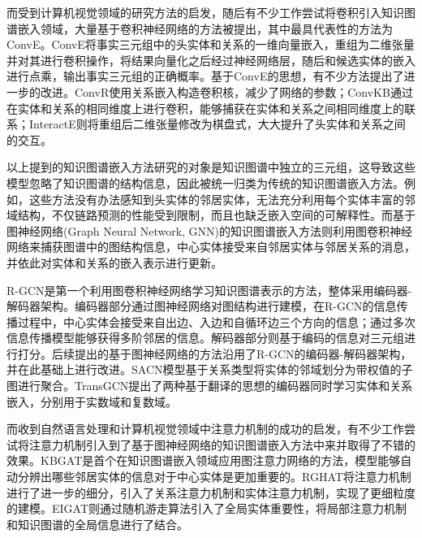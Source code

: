 而受到计算机视觉领域的研究方法的启发，随后有不少工作尝试将卷积引入知识图谱嵌入领域，大量基于卷积神经网络的方法被提出，其中最具代表性的方法为ConvE。ConvE将事实三元组中的头实体和关系的一维向量嵌入，重组为二维张量并对其进行卷积操作，将结果向量化之后经过神经网络层，随后和候选实体的嵌入进行点乘，输出事实三元组的正确概率。基于ConvE的思想，有不少方法提出了进一步的改进。ConvR使用关系嵌入构造卷积核，减少了网络的参数；ConvKB通过在实体和关系的相同维度上进行卷积，能够捕获在实体和关系之间相同维度上的联系；InteractE则将重组后二维张量修改为棋盘式，大大提升了头实体和关系之间的交互。

以上提到的知识图谱嵌入方法研究的对象是知识图谱中独立的三元组，这导致这些模型忽略了知识图谱的结构信息，因此被统一归类为传统的知识图谱嵌入方法。例如，这些方法没有办法感知到头实体的邻居实体，无法充分利用每个实体丰富的邻域结构，不仅链路预测的性能受到限制，而且也缺乏嵌入空间的可解释性。而基于图神经网络(Graph Neural Network, GNN)的知识图谱嵌入方法则利用图卷积神经网络来捕获图谱中的图结构信息，中心实体接受来自邻居实体与邻居关系的消息，并依此对实体和关系的嵌入表示进行更新。

R-GCN是第一个利用图卷积神经网络学习知识图谱表示的方法，整体采用编码器-解码器架构。编码器部分通过图神经网络对图结构进行建模，在R-GCN的信息传播过程中，中心实体会接受来自出边、入边和自循环边三个方向的信息；通过多次信息传播模型能够获得多阶邻居的信息。解码器部分则基于编码的信息对三元组进行打分。后续提出的基于图神经网络的方法沿用了R-GCN的编码器-解码器架构，并在此基础上进行改进。SACN模型基于关系类型将实体的邻域划分为带权值的子图进行聚合。TransGCN提出了两种基于翻译的思想的编码器同时学习实体和关系嵌入，分别用于实数域和复数域。

而收到自然语言处理和计算机视觉领域中注意力机制的成功的启发，有不少工作尝试将注意力机制引入到了基于图神经网络的知识图谱嵌入方法中来并取得了不错的效果。KBGAT是首个在知识图谱嵌入领域应用图注意力网络的方法，模型能够自动分辨出哪些邻居实体的信息对于中心实体是更加重要的。RGHAT将注意力机制进行了进一步的细分，引入了关系注意力机制和实体注意力机制，实现了更细粒度的建模。EIGAT则通过随机游走算法引入了全局实体重要性，将局部注意力机制和知识图谱的全局信息进行了结合。

